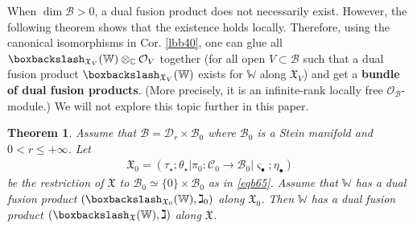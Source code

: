 \documentclass[11pt,b5paper,notitlepage]{article}
\theoremstyle{definition}
\theoremstyle{plain}
\newtheorem{thm}[df]{Theorem}
\newcommand{\mc}{\mathcal}
\newcommand{\sgm}{\varsigma}
\newcommand{\blt}{\bullet}
\newcommand{\Wbb}{\mathbb W}
\newcommand{\Cbb}{\mathbb C}
\newcommand{\<}{\left\langle}
\renewcommand{\>}{\right\rangle}
\newcommand{\MC}{\mathcal{C}}
\newcommand{\MB}{\mathcal{B}}
\newcommand{\fx}{\mathfrak{X}}
\newcommand{\bbs}{\boxbackslash}
\numberwithin{equation}{section}
\begin{document}
When $\dim\MB>0$, a dual fusion product does not necessarily exist.  However, the following theorem shows that the existence holds locally. Therefore, using the canonical isomorphisms in Cor. \ref{lbb40}, one can glue all $\bbs_{\fx_V}(\Wbb)\otimes_\Cbb \mc O_V$ together (for all open $V\subset\MB$ such that a dual fusion product $\bbs_{\fx_V}(\Wbb)$ exists for $\Wbb$ along $\fx_V$) and get a \textbf{bundle of dual fusion products}. (More precisely, it is an infinite-rank locally free $\mc O_\MB$-module.) We will not explore this topic further in this paper.

\begin{thm}\label{lbb37}
Assume that $\MB=\mc D_r\times\MB_0$ where $\MB_0$ is a Stein manifold and $0<r\leq +\infty$. Let
\begin{align*}
\fx_0=(\tau_\star;\theta_\star|\pi_0:\MC_0\rightarrow\MB_0|\sgm_\blt;\eta_\blt)
\end{align*}
be the restriction of $\fx$ to $\MB_0\simeq\{0\}\times\MB_0$ as in \eqref{eqb65}. Assume that $\Wbb$ has a dual fusion product $(\bbs_{\fx_0}(\Wbb),\gimel_0)$ along $\fx_0$. Then $\Wbb$ has a dual fusion product $(\bbs_\fx(\Wbb),\gimel)$ along $\fx$.
\end{thm}
\end{document}
